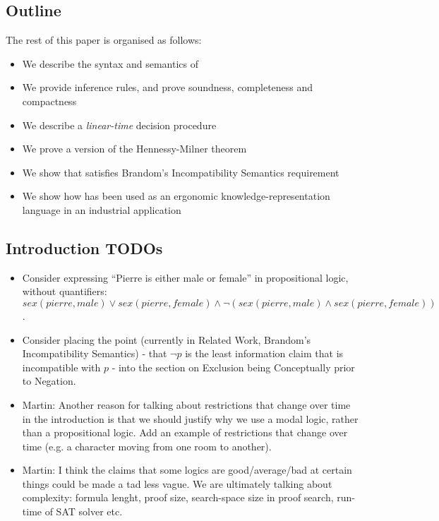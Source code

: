 \subsection{Outline}
The rest of this paper is organised as follows:
\begin{itemize}
\item
We describe the syntax and semantics of \ELFULL{}
\item
We provide inference rules, and prove soundness, completeness and compactness
\item
We describe a \emph{linear-time} decision procedure
\item
We prove a version of the Hennessy-Milner theorem
\item
We show that \ELFULL{} satisfies Brandom's Incompatibility Semantics requirement
\item
We show how \ELFULL{} has been used as an ergonomic knowledge-representation language in an industrial application
\end{itemize}

\subsection{Introduction TODOs}

\begin{itemize}
\item Consider expressing ``Pierre is either male or female'' in propositional logic, without quantifiers:
$sex(pierre, male) \lor sex(pierre, female) \land \neg (sex(pierre, male) \land sex(pierre, female))$.
\item
Consider placing the point (currently in Related Work, Brandom's Incompatibility Semantics) - that $\neg p$ is the least information claim that is incompatible with $p$ - into the section on Exclusion being Conceptually prior to Negation.
\item
Martin: Another reason for talking about restrictions that change over time in
the introduction is that we should justify why we use a modal logic,
rather than a propositional logic. Add an example of restrictions that change over time (e.g. a character moving from one room to another).
\item
Martin: I think the claims that some logics are good/average/bad at certain things
could be made a tad less vague. We are ultimately talking about
complexity: formula lenght, proof size, search-space size in proof
search, run-time of SAT solver etc.
\end{itemize}
